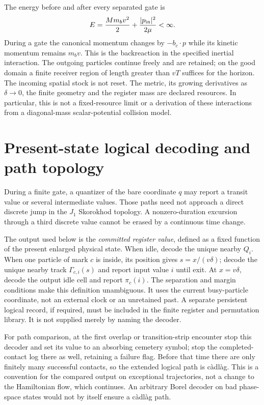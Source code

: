 \documentclass[11pt,oneside,openany]{book}
\theoremstyle{definition}
\theoremstyle{remark}\newtheorem{remark}[theorem]{Remark}
\begin{document}
The energy before and after every separated gate is
\begin{equation}\label{p:mech-energy}
 E=\frac{Mm_bv^2}{2}+\frac{|p_{\rm in}|^2}{2\mu}<\infty.
\end{equation}
During a gate the canonical momentum changes by $-b_c\cdot p$ while its
kinetic momentum remains $m_bv$. This is the backreaction in the specified
inertial interaction. The outgoing particles continue freely and are retained;
on the good domain a finite receiver region of length greater than $vT$
suffices for the horizon. The incoming spatial stock is not reset.
The metric, its growing derivatives as $\delta\to0$, the finite geometry and
the register mass are declared resources. In particular, this is not a
fixed-resource limit or a derivation of these interactions from a
diagonal-mass scalar-potential collision model.

\section{Present-state logical decoding and path topology}

During a finite gate, a quantizer of the bare coordinate $q$ may report a
transit value or several intermediate values. Those paths need not approach
a direct discrete jump in the $J_1$ Skorokhod topology. A nonzero-duration
excursion through a third discrete value cannot be erased by a continuous
time change.

The output used below is the \emph{committed register value}, defined as a
fixed function of the present enlarged physical state. When idle, decode the
unique nearby $Q_i$. When one particle of mark $c$ is inside, its position
gives $s=x/(v\delta)$; decode the unique nearby track $\Gamma_{c,i}(s)$ and
report input value $i$ until exit. At $x=v\delta$, decode the output idle
cell and report $\pi_c(i)$. The separation and margin conditions make this
definition unambiguous. It uses the current busy-particle coordinate, not an
external clock or an unretained past. A separate persistent logical record,
if required, must be included in the finite register and permutation library.
It is not supplied merely by naming the decoder.

For path comparison, at the first overlap or transition-strip encounter
stop this decoder and set its value to an absorbing cemetery symbol;
stop the completed-contact log there as well, retaining a failure flag.
Before that time there are only finitely many successful contacts, so
the extended logical path is c\`adl\`ag. This is a convention for the
compared output on exceptional trajectories, not a change to the
Hamiltonian flow, which continues. An arbitrary Borel decoder on bad
phase-space states would not by itself ensure a c\`adl\`ag path.
\end{document}
